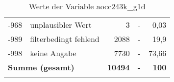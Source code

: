 \begin{longtable}{Xlrrr}
       -968 & unplausibler Wert & 3 & - & 0,03 \\

       -989 & filterbedingt fehlend & 2088 & - & 19,9 \\

       -998 & keine Angabe & 7730 & - & 73,66 \\

     \midrule
     \multicolumn{2}{l}{\textbf{Summe (gesamt)}} & \textbf{10494} & \textbf{-} & \textbf{100} \\
     \bottomrule
     \caption{Werte der Variable aocc243k\_g1d}
     \end{longtable}
     
